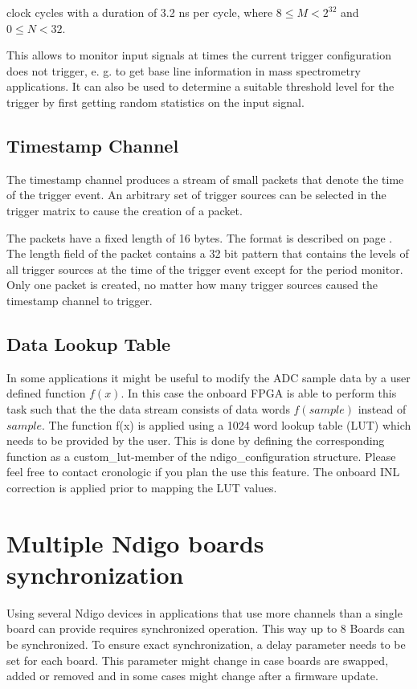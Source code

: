         clock cycles with a duration of 3.2 ns per cycle, where $8 \leq M < 2^{32}$ and $0 \leq N < 32$.\par

        This allows to monitor input signals at times the current trigger configuration does not trigger, e. g. to get base line information in mass spectrometry applications. It can also be used to determine a suitable threshold level for the trigger by first getting random statistics on the input signal.

    \subsection{Timestamp Channel}

        The timestamp channel produces a stream of small packets that denote the time of the trigger event. An arbitrary set of trigger sources can be selected in the trigger matrix to cause the creation of a packet.\par

        The packets have a fixed length of 16 bytes. The format is described on page \pageref{cp:packetformat}. The length field of the packet contains a 32 bit pattern that contains the levels of all trigger sources at the time of the trigger event except for the period monitor. Only one packet is created, no matter how many trigger sources caused the timestamp channel to trigger.

    \subsection{Data Lookup Table}

        In some applications it might be useful to modify the ADC sample data by a user defined function $f(x)$. In this case the onboard FPGA is able to perform this task such that the the data stream consists of data words $f(sample)$ instead of $sample$. The function f(x) is applied using a 1024 word lookup table (LUT) which needs to be provided by the user. This is done by defining the corresponding function as a custom\_lut-member of the ndigo\_configuration structure. Please feel free to contact cronologic if you plan the use this feature. The onboard INL correction is applied prior to mapping the LUT values.

\section{Multiple Ndigo boards synchronization}
    Using several Ndigo devices in applications that use more channels than a single board can provide requires synchronized operation. This way up to 8 Boards can be synchronized. To ensure exact synchronization, a delay parameter needs to be set for each board. This parameter might change in case boards are swapped, added or removed and in some cases might change after a firmware update.\par

